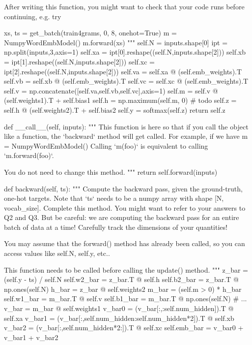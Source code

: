 \documentclass[12pt]{article}
\begin{document}
\begin{python}
        After writing this function, you might want to check that your code
        runs before continuing, e.g. try

            xs, ts = get_batch(train4grams, 0, 8, onehot=True)
            m = NumpyWordEmbModel()
            m.forward(xs)
        """
        self.N = inputs.shape[0]
        ipt = np.split(inputs,3,axis=1)
        self.xa = ipt[0].reshape((self.N,inputs.shape[2])) 
        self.xb = ipt[1].reshape((self.N,inputs.shape[2])) 
        self.xc = ipt[2].reshape((self.N,inputs.shape[2])) 
        self.va = self.xa @ (self.emb_weights).T 
        self.vb = self.xb @ (self.emb_weights).T 
        self.vc = self.xc @ (self.emb_weights).T 
        self.v = np.concatenate([self.va,self.vb,self.vc],axis=1) 
        self.m = self.v @ (self.weights1).T + self.bias1 
        self.h = np.maximum(self.m, 0) # todo
        self.z = self.h @ (self.weights2).T + self.bias2 
        self.y = softmax(self.z)
        return self.z



    def __call__(self, inputs):
        """
        This function is here so that if you call the object like a function,
        the `backward` method will get called. For example, if we have
            m = NumpyWordEmbModel()
        Calling `m(foo)` is equivalent to calling `m.forward(foo)`.

        You do not need to change this method.
        """
        return self.forward(inputs)

    def backward(self, ts):
        """
        Compute the backward pass, given the ground-truth, one-hot targets.
        Note that `ts` needs to be a numpy array with shape [N, vocab_size].
        Complete this method. You might want to refer to your answers to Q2
        and Q3. But be careful: we are computing the backward pass for an
        entire batch of data at a time! Carefully track the dimensions of your
        quantities!

        You may assume that the forward() method has already been called, so
        you can access values like self.N, self.y, etc..

        This function needs to be called before calling the update() method.
        """
        z_bar = (self.y - ts) / self.N
        self.w2_bar = z_bar.T @ self.h 
        self.b2_bar = z_bar.T @ np.ones(self.N) 
        h_bar = z_bar @ self.weights2 
        m_bar = (self.m > 0) * h_bar 
        self.w1_bar = m_bar.T @ self.v 
        self.b1_bar = m_bar.T @ np.ones(self.N) 
        # ...
        v_bar = m_bar @ self.weights1
        v_bar0 = (v_bar[:,:self.num_hidden]).T @ self.xa
        v_bar1 = (v_bar[:,self.num_hidden:self.num_hidden*2]).T @ self.xb
        v_bar2 = (v_bar[:,self.num_hidden*2:]).T @ self.xc
        self.emb_bar = v_bar0 + v_bar1 + v_bar2


\end{python}
\end{document}
